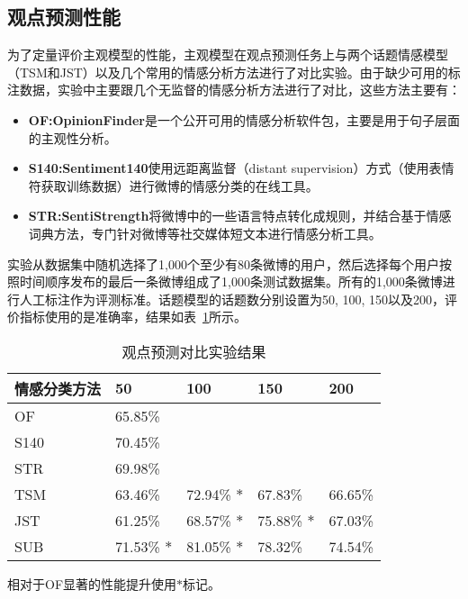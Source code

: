\subsection{观点预测性能}
为了定量评价主观模型的性能，主观模型在观点预测任务上与两个话题情感模型（TSM和JST）以及几个常用的情感分析方法进行了对比实验。由于缺少可用的标注数据，实验中主要跟几个无监督的情感分析方法进行了对比，这些方法主要有：
\begin{itemize}
\item \textbf{OF:OpinionFinder}是一个公开可用的情感分析软件包，主要是用于句子层面的主观性分析。
\item \textbf{S140:Sentiment140}使用远距离监督（distant supervision）方式（使用表情符获取训练数据）进行微博的情感分类的在线工具。
\item \textbf{STR:SentiStrength}将微博中的一些语言特点转化成规则，并结合基于情感词典方法，专门针对微博等社交媒体短文本进行情感分析工具。
\end{itemize}

实验从数据集中随机选择了1,000个至少有80条微博的用户，然后选择每个用户按照时间顺序发布的最后一条微博组成了1,000条测试数据集。所有的1,000条微博进行人工标注作为评测标准。话题模型的话题数分别设置为50, 100, 150以及200，评价指标使用的是准确率，结果如表~\ref{tab5-2}所示。

\begin{table}[htb]
\centering
\caption{观点预测对比实验结果}
\label{tab5-2}
\begin{tabular}{|l|l|l|l|l|}
\hline
情感分类方法 & 50 & 100 & 150 & 200\\
\hline
OF &  65.85\%& & & \\
\hline
S140 &  70.45\%& & & \\\hline
STR &  69.98\%& & & \\\hline
TSM & 63.46\%& 72.94\% $ \ast $  &67.83\% & 66.65\% \\\hline
JST & 61.25\% & 68.57\% $ \ast $ & 75.88\%  $ \ast $ & 67.03\%\\\hline
SUB & 71.53\% $ \ast $ & 81.05\% $ \ast $ & 78.32\% & 74.54\%\\
\hline
\end{tabular}
\begin{tablenotes}
  \centering
  \footnotesize
  \item 相对于OF显著的性能提升使用$ \ast $标记。\\
\end{tablenotes}
\end{table}

